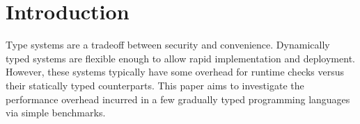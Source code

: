 \section{Introduction}
Type systems are a tradeoff between security and convenience. Dynamically typed systems are flexible enough to allow rapid implementation and deployment. However, these systems typically have some overhead for runtime checks versus their statically typed counterparts. This paper aims to investigate the  performance overhead incurred in a few gradually typed programming languages via simple benchmarks.

